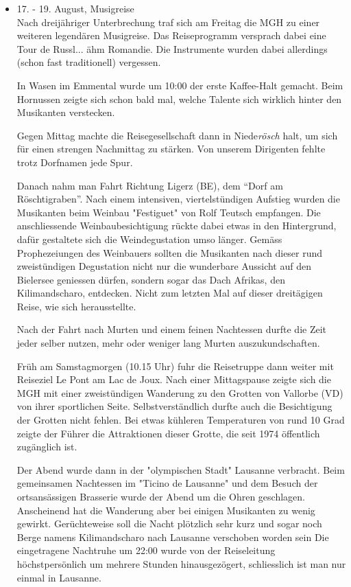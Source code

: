 \begin{history}
\begin{itemize}
        \item[]17. - 19. August, Musigreise\\
        Nach dreijähriger Unterbrechung traf sich am Freitag die MGH zu einer
        weiteren legendären Musigreise. Das Reiseprogramm versprach dabei eine
        Tour de Russl... ähm Romandie. Die Instrumente wurden dabei allerdings
        (schon fast traditionell) vergessen.

        In Wasen im Emmental wurde um 10:00 der erste Kaffee-Halt gemacht. Beim
        Hornussen zeigte sich schon bald mal, welche Talente sich wirklich
        hinter den Musikanten verstecken.

        Gegen Mittag machte die Reisegesellschaft dann in Niede\emph{rösch}
        halt, um sich für einen strengen Nachmittag zu stärken. Von unserem
        Dirigenten fehlte trotz Dorfnamen jede Spur.

        Danach nahm man Fahrt Richtung Ligerz (BE), dem \enquote{Dorf am
            Röschtigraben}. Nach einem intensiven, viertelstündigen Aufstieg
        wurden die Musikanten beim Weinbau "Festiguet" von Rolf Teutsch
        empfangen. Die anschliessende Weinbaubesichtigung rückte dabei etwas
        in den Hintergrund, dafür gestaltete sich die Weindegustation umso
        länger. Gemäss Prophezeiungen des Weinbauers sollten die Musikanten
        nach dieser rund zweistündigen Degustation nicht nur die wunderbare
        Aussicht auf den Bielersee geniessen dürfen, sondern sogar das Dach
        Afrikas, den Kilimandscharo, entdecken. Nicht zum letzten Mal auf
        dieser dreitägigen Reise, wie sich herausstellte.

        Nach der Fahrt nach Murten und einem feinen Nachtessen durfte die Zeit
        jeder selber nutzen, mehr oder weniger lang Murten auszukundschaften.

        Früh am Samstagmorgen (10.15 Uhr) fuhr die Reisetruppe dann weiter mit
        Reiseziel Le Pont am Lac de Joux. Nach einer Mittagspause zeigte sich
        die MGH mit einer zweistündigen Wanderung zu den Grotten von Vallorbe
        (VD) von ihrer sportlichen Seite. Selbstverständlich durfte auch die
        Besichtigung der Grotten nicht fehlen. Bei etwas kühleren Temperaturen
        von rund 10 Grad zeigte der Führer die Attraktionen dieser Grotte, die
        seit 1974 öffentlich zugänglich ist.

        Der Abend wurde dann in der "olympischen Stadt" Lausanne verbracht. Beim
        gemeinsamen Nachtessen im "Ticino de Lausanne" und dem Besuch der
        ortsansässigen Brasserie wurde der Abend um die Ohren geschlagen.
        Anscheinend hat die Wanderung aber bei einigen Musikanten zu wenig
        gewirkt. Gerüchteweise soll die Nacht plötzlich sehr kurz und sogar noch
        Berge namens Kilimandscharo nach Lausanne verschoben worden sein Die
        eingetragene Nachtruhe um 22:00 wurde von der Reiseleitung
        höchstpersönlich um mehrere Stunden hinausgezögert, schliesslich ist man
        nur einmal in Lausanne.


\end{itemize}
\end{history}
